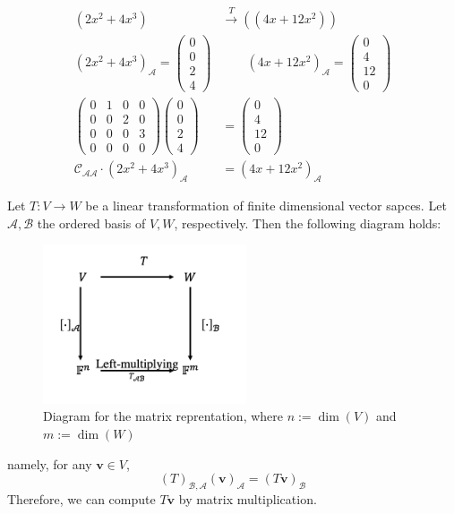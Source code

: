 \begin{example}
\begin{align*}
(2x^2+4x^3)&\xrightarrow{T} ((4x+12x^2))\\
(2x^2+4x^3)_{\mathcal{A}}
=
\begin{pmatrix}
0\\0\\2\\4
\end{pmatrix}&\qquad
(4x+12x^2)_{\mathcal{A}}
=
\begin{pmatrix}
0\\4\\12\\0
\end{pmatrix}\\
\begin{pmatrix}
0&1&0&0\\0&0&2&0\\0&0&0&3\\0&0&0&0
\end{pmatrix}\begin{pmatrix}
0\\0\\2\\4
\end{pmatrix}&=\begin{pmatrix}
0\\4\\12\\0
\end{pmatrix}\\
\mathcal{C}_{\mathcal{A}\mathcal{A}}\cdot
(2x^2+4x^3)_{\mathcal{A}}
&=
(4x+12x^2)_{\mathcal{A}}
\end{align*}
\end{example}

\begin{theorem}\label{The:3:3}
Let $T:V\to W$ be a linear transformation of finite dimensional vector sapces. Let $\mathcal{A},\mathcal{B}$ the ordered basis of $V,W$, respectively.
Then the following diagram holds:
\begin{figure}[H]
\centering
\includegraphics[width=6cm]{week3/p_2}
\caption{Diagram for the matrix reprentation, where $n:=\dim(V)$ and $m:=\dim(W)$}
\end{figure}
namely, for any $\bm v\in V$,
\[
(T)_{\mathcal{B},\mathcal{A}}(\bm v)_{\mathcal{A}}
=
(T\bm v)_{\mathcal{B}}
\]
Therefore, we can compute $T\bm v$ by matrix multiplication.
\end{theorem}

